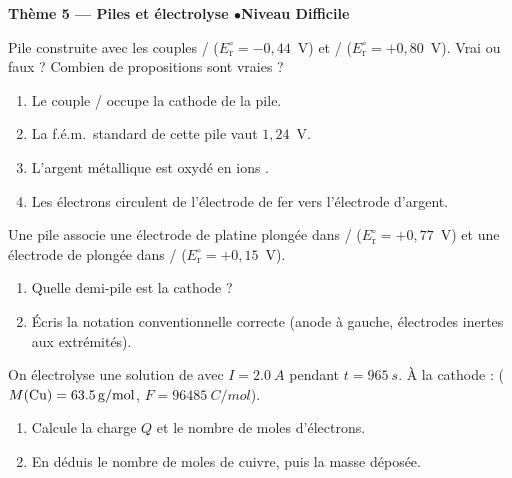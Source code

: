 \documentclass[11pt,a4paper]{article}
\begin{document}
\begin{center}\color{primarydark}\large\bfseries Thème 5 — Piles et électrolyse \quad$\bullet$\quad Niveau Difficile\end{center}

\begin{exo}
Pile construite avec les couples / ($E_{\mathrm{r}}^{\circ}=-0{,}44$~V) et
/ ($E_{\mathrm{r}}^{\circ}=+0{,}80$~V). Vrai ou faux ? Combien de propositions sont
vraies ?
\begin{enumerate}[label=\alph*)]
  \item Le couple / occupe la cathode de la pile.
  \item La f.é.m.\ standard de cette pile vaut $1{,}24$~V.
  \item L'argent métallique est oxydé en ions .
  \item Les électrons circulent de l'électrode de fer vers l'électrode d'argent.
\end{enumerate}
\end{exo}

\begin{exo}
Une pile associe une électrode de platine  plongée dans /
($E_{\mathrm{r}}^{\circ}=+0{,}77$~V) et une électrode de  plongée dans /
($E_{\mathrm{r}}^{\circ}=+0{,}15$~V).
\begin{enumerate}[label=\alph*)]
  \item Quelle demi-pile est la cathode ?
  \item Écris la notation conventionnelle correcte (anode à gauche, électrodes inertes aux extrémités).
\end{enumerate}
\end{exo}

\begin{exo}
On électrolyse une solution de  avec $I=\qty{2.0}{A}$ pendant $t=\qty{965}{s}$. À la cathode :
 ($M(\ce{Cu})=\qty{63.5}{g\per mol}$, $F=\qty{96485}{C\per mol}$).
\begin{enumerate}[label=\alph*)]
  \item Calcule la charge $Q$ et le nombre de moles d'électrons.
  \item En déduis le nombre de moles de cuivre, puis la masse déposée.
\end{enumerate}
\end{exo}
\end{document}

